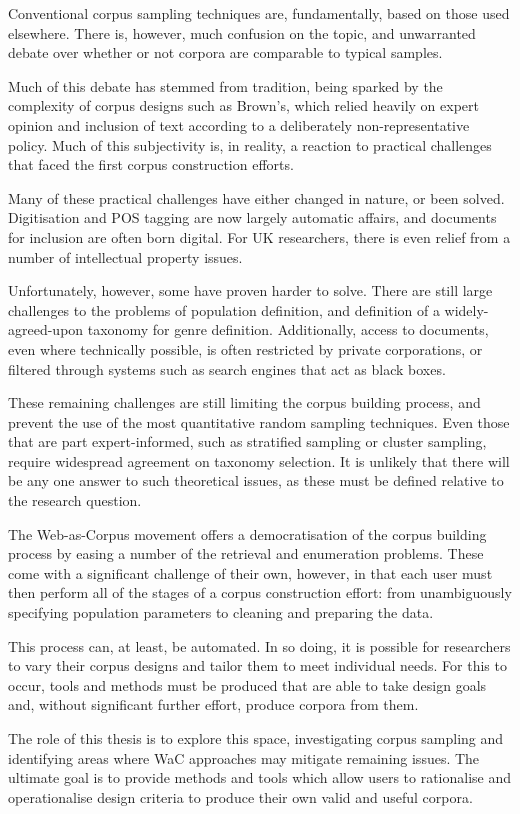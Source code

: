 
Conventional corpus sampling techniques are, fundamentally, based on those used elsewhere.  There is, however, much confusion on the topic, and unwarranted debate over whether or not corpora are comparable to typical samples.

Much of this debate has stemmed from tradition, being sparked by the complexity of corpus designs such as Brown's, which relied heavily on expert opinion and inclusion of text according to a deliberately non-representative policy.  Much of this subjectivity is, in reality, a reaction to practical challenges that faced the first corpus construction efforts.

Many of these practical challenges have either changed in nature, or been solved.  Digitisation and POS tagging are now largely automatic affairs, and documents for inclusion are often born digital.  For UK researchers, there is even relief from a number of intellectual property issues.

Unfortunately, however, some have proven harder to solve.  There are still large challenges to the problems of population definition, and definition of a widely-agreed-upon taxonomy for genre definition.  Additionally, access to documents, even where technically possible, is often restricted by private corporations, or filtered through systems such as search engines that act as black boxes.

These remaining challenges are still limiting the corpus building process, and prevent the use of the most quantitative random sampling techniques.  Even those that are part expert-informed, such as stratified sampling or cluster sampling, require widespread agreement on taxonomy selection.  It is unlikely that there will be any one answer to such theoretical issues, as these must be defined relative to the research question.

The Web-as-Corpus movement offers a democratisation of the corpus building process by easing a number of the retrieval and enumeration problems.  These come with a significant challenge of their own, however, in that each user must then perform all of the stages of a corpus construction effort: from unambiguously specifying population parameters to cleaning and preparing the data.

This process can, at least, be automated.  In so doing, it is possible for researchers to vary their corpus designs and tailor them to meet individual needs.  For this to occur, tools and methods must be produced that are able to take design goals and, without significant further effort, produce corpora from them.

The role of this thesis is to explore this space, investigating corpus sampling and identifying areas where WaC approaches may mitigate remaining issues.  The ultimate goal is to provide methods and tools which allow users to rationalise and operationalise design criteria to produce their own valid and useful corpora.


